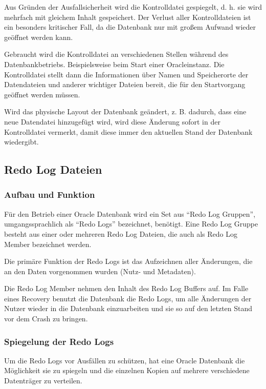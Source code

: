 
          Aus Gründen der Ausfallsicherheit wird die Kontrolldatei gespiegelt, d. h. sie wird mehrfach mit gleichem Inhalt gespeichert. Der Verlust aller Kontrolldateien ist ein besonders kritischer Fall, da die Datenbank nur mit großem Aufwand wieder geöffnet werden kann.

          Gebraucht wird die Kontrolldatei an verschiedenen Stellen während des Datenbankbetriebs. Beispielsweise beim Start einer Oracleinstanz. Die Kontrolldatei stellt dann die Informationen über Namen und Speicherorte der Datendateien und anderer wichtiger Dateien bereit, die für den Startvorgang geöffnet werden müssen.

          Wird das physische Layout der Datenbank geändert, z. B. dadurch, dass eine neue Datendatei hinzugefügt wird, wird diese Änderung sofort in der Kontrolldatei vermerkt, damit diese immer den aktuellen Stand der Datenbank wiedergibt.
        \subsection{Redo Log Dateien}
          \subsubsection{Aufbau und Funktion}
            Für den Betrieb einer Oracle Datenbank wird ein Set aus \enquote{Redo Log Gruppen}, umgangssprachlich als \enquote{Redo Logs} bezeichnet, benötigt. Eine Redo Log Gruppe besteht aus einer oder mehreren Redo Log Dateien, die auch als Redo Log Member bezeichnet werden.

            Die primäre Funktion der Redo Logs ist das Aufzeichnen aller Änderungen, die an den Daten vorgenommen wurden (Nutz- und Metadaten).


            Die Redo Log Member nehmen den Inhalt des Redo Log Buffers auf. Im Falle eines Recovery benutzt die Datenbank die Redo Logs, um alle Änderungen der Nutzer wieder in die Datenbank einzuarbeiten und sie so auf den letzten Stand vor dem Crash zu bringen.


          \subsubsection{Spiegelung der Redo Logs}
            Um die Redo Logs vor Ausfällen zu schützen, hat eine Oracle Datenbank die Mög\-lich\-keit sie zu spiegeln und die einzelnen Kopien auf mehrere verschiedene Datenträger zu verteilen.

